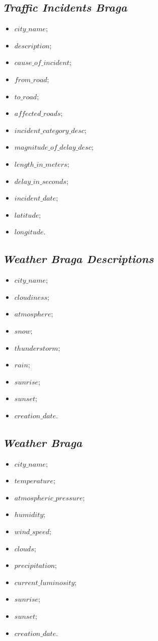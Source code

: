 \documentclass[a4paper, 12pt]{article}
\begin{document}
\subsection{\textit{Traffic Incidents Braga}}

\begin{itemize}
	\item $city\_name$;
	\item $description$;
	\item $cause\_of\_incident$;
	\item $from\_road$;
	\item $to\_road$;
	\item $affected\_roads$;
	\item $incident\_category\_desc$;
	\item $magnitude\_of\_delay\_desc$;
	\item $length\_in\_meters$;
	\item $delay\_in\_seconds$;
	\item $incident\_date$;
	\item $latitude$;
	\item $longitude$.
\end{itemize}

\subsection{\textit{Weather Braga Descriptions}}

\begin{itemize}
	\item $city\_name$;
	\item $cloudiness$;
	\item $atmosphere$;
	\item $snow$;
	\item $thunderstorm$;
	\item $rain$;
	\item $sunrise$;
	\item $sunset$;
	\item $creation\_date$.
\end{itemize}

\subsection{\textit{Weather Braga}}

\begin{itemize}
	\item $city\_name$;
	\item $temperature$;
	\item $atmospheric\_pressure$;
	\item $humidity$;
	\item $wind\_speed$;
	\item $clouds$;
	\item $precipitation$;
	\item $current\_luminosity$;
	\item $sunrise$;
	\item $sunset$;
	\item $creation\_date$.
\end{itemize}
\end{document}
